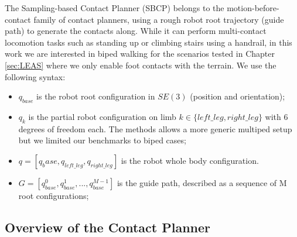 The Sampling-based Contact Planner (SBCP) \cite{AcyclicCP} belongs to the motion-before-contact family of contact planners, using a rough robot root trajectory (guide path) to generate the contacts along.
While it can perform multi-contact locomotion tasks such as standing up or climbing stairs using a handrail, in this work we are interested in biped walking for the scenarios tested in Chapter \ref{sec:LEAS} where we only enable foot contacts with the terrain.
We use the following syntax:
\begin{itemize}
    \item $q_{base}$ is the robot root configuration in $SE(3)$ (position and orientation);
    \item $q_k$ is the partial robot configuration on limb $k\in\{left\_leg, right\_leg\}$ with 6 degrees of freedom each. The methods allows a more generic multiped setup but we limited our benchmarks to biped cases;
    \item $q = [q_base,q_{left\_leg},q_{right\_leg}]$ is the robot whole body configuration.
    \item $G = [q_{base}^0,q_{base}^1,..., q_{base}^{M-1}]$ is the guide path, described as a sequence of M root configurations;
\end{itemize}



\subsection{Overview of the Contact Planner}


